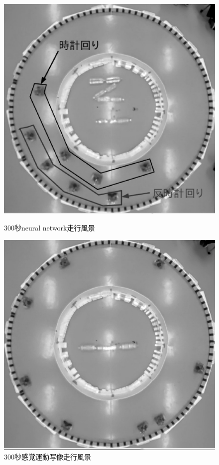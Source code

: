 \begin{figure}[h]
    \begin{minipage}{0.48\linewidth}
        \centering
        \includegraphics[width=1.0\linewidth]{NN_exp.eps}
        \caption{300秒neural network走行風景}
        \label{NN300}
    \end{minipage}
    \begin{minipage}{0.48\linewidth}
        \centering
        \includegraphics[width=1.0\linewidth]{SMM270_exp.eps}
        \caption{300秒感覚運動写像走行風景}
        \label{SMM300}
    \end{minipage}
\end{figure}

